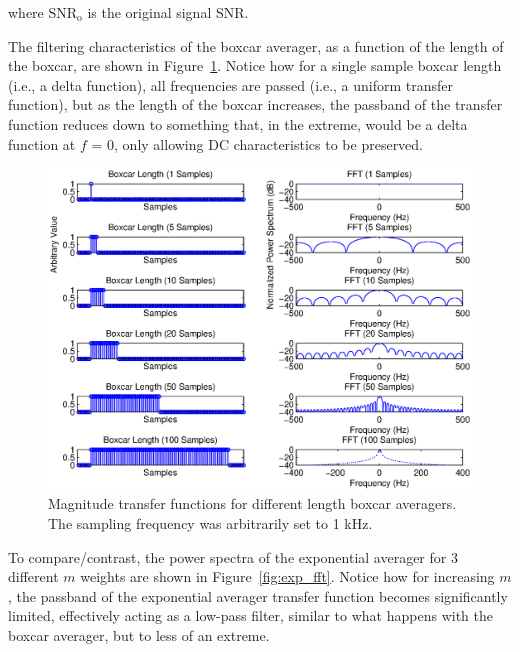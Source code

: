where $\textrm{SNR}_\textrm{o}$ is the original signal SNR.

The filtering characteristics of the boxcar averager, as a function of the length of the boxcar, are shown in Figure~\ref{fig:boxcar_fft}.  Notice how for a single sample boxcar length (i.e., a delta function), all frequencies are passed (i.e., a uniform transfer function), but as the length of the boxcar increases, the passband of the transfer function reduces down to something that, in the extreme, would be a delta function at $f$ = 0, only allowing DC characteristics to be preserved.

\begin{figure}[htb!]
\centering
\includegraphics[width=1.0\linewidth]{boxcar_averager/boxcar_fft.eps}
\caption{Magnitude transfer functions for different length boxcar averagers.  The sampling frequency was arbitrarily set to 1 kHz.}
\label{fig:boxcar_fft}
\end{figure}

To compare/contrast, the power spectra of the exponential averager for 3 different $m$ weights are shown in Figure~\ref{fig:exp_fft}.  Notice how for increasing $m$, the passband of the exponential averager transfer function becomes significantly limited, effectively acting as a low-pass filter, similar to what happens with the boxcar averager, but to less of an extreme.

